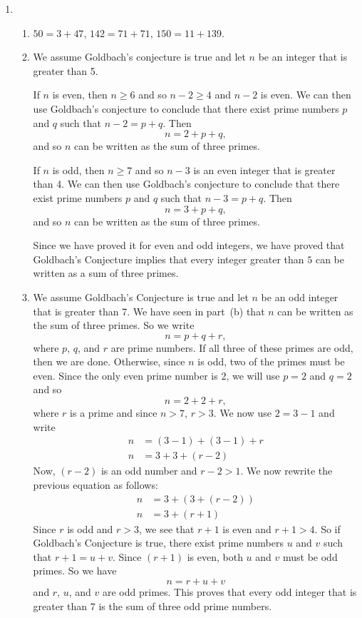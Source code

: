\begin{enumerate}
\item \begin{enumerate}
\item $50 = 3 + 47$, \quad $142 = 71 + 71$, \quad $150 = 11 + 139$.

\item We assume Goldbach's conjecture is true and let $n$ be an integer that is greater than 5.

If $n$ is even, then $n \geq 6$ and so $n - 2 \geq 4$ and $n -2$ is even.  We can then use Goldbach's conjecture to conclude that there exist prime numbers $p$ and $q$ such that $n - 2 = p + q$.  Then
\[
n = 2 + p + q,
\]
and so $n$ can be written as the sum of three primes.

If $n$ is odd, then $n \geq 7$ and so $n - 3$ is an even integer that is greater than 4.  We can then use Goldbach's conjecture to conclude that there exist prime numbers $p$ and $q$ such that $n - 3 = p + q$.  Then
\[
n = 3 + p + q,
\]
and so $n$ can be written as the sum of three primes.

Since we have proved it for even and odd integers, we have proved that Goldbach's Conjecture implies that every integer greater than $5$ can be written as a sum of three primes.


\item We assume Goldbach's Conjecture is true and let $n$ be an odd integer that is greater than 7. We have seen in part~(b) that $n$ can be written as the sum of three primes.  So we write
\[
n = p + q + r,
\]
where $p$, $q$, and $r$ are prime numbers.  If all three of these primes are odd, then we are done.  Otherwise, since $n$ is odd, two of the primes must be even.  Since the only even prime number is 2, we will use $p = 2$ and $q = 2$ and so
\[
n = 2 + 2 + r,
\]
where $r$ is a prime and since $n > 7$, $r > 3$.  We now use $2 = 3 - 1$ and write
\begin{align*}
n &= (3 - 1) + (3 - 1) + r \\
n &= 3 + 3 + (r - 2)
\end{align*}
Now, $(r - 2)$ is an odd number and $r - 2 > 1$.  We now rewrite the previous equation as follows:
\begin{align*}
n & = 3 + (3 + (r - 2)) \\
n & = 3 + (r + 1)
\end{align*}
Since $r$ is odd and $r > 3$, we see that $r + 1$ is even and $r + 1 > 4$.  So if Goldbach's Conjecture is true, there exist prime numbers $u$ and $v$ such that $r + 1 = u + v$.  Since $(r + 1)$ is even, both $u$ and $v$ must be odd primes.  So we have
\[
n = r + u + v
\]
and $r$, $u$, and $v$ are odd primes.  This proves that every odd integer that is greater than 7 is the sum of three odd prime numbers.


\end{enumerate}
\end{enumerate}
